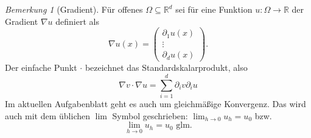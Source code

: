 \documentclass{scrartcl}
\newcommand{\reals}{\mathbb{R}}
\theoremstyle{remark}
\newtheorem {remark} {Bemerkung}
\begin{document}

  \begin{remark}[Gradient]
    Für offenes $\Omega \subseteq \reals^d$ sei für eine Funktion $u \colon \Omega \to \reals$ der Gradient $\nabla u$ definiert als
    \begin{equation}
      \nabla u (x) =
      \begin{pmatrix} %
        \partial_1 u(x) \\
        \vdots \\
        \partial_d u(x)
      \end{pmatrix}.
    \end{equation}
    Der einfache Punkt $\cdot$ bezeichnet das Standardskalarprodukt, also
    \begin{equation}
      \nabla v \cdot \nabla u = \sum_{i=1}^{d} \partial_i v \partial_i u
    \end{equation}
    Im aktuellen Aufgabenblatt geht es auch um gleichmäßige Konvergenz. Das wird auch mit dem üblichen $\lim$ Symbol geschrieben: $\lim_{h \to 0} u_h = u_0$ bzw.\
    \begin{equation}
      \lim_{h \to 0} u_h = u_0 \text{ glm.}
    \end{equation}
  \end{remark}
\end{document}
